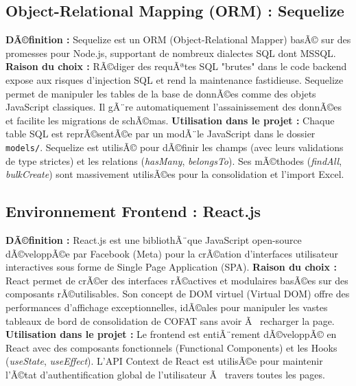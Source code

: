\subsection{Object-Relational Mapping (ORM) : Sequelize}
\textbf{DÃ©finition :} Sequelize est un ORM (Object-Relational Mapper) basÃ© sur des promesses pour Node.js, supportant de nombreux dialectes SQL dont MSSQL.
\newline
\textbf{Raison du choix :} RÃ©diger des requÃªtes SQL "brutes" dans le code backend expose aux risques d'injection SQL et rend la maintenance fastidieuse. Sequelize permet de manipuler les tables de la base de donnÃ©es comme des objets JavaScript classiques. Il gÃ¨re automatiquement l'assainissement des donnÃ©es et facilite les migrations de schÃ©mas.
\newline
\textbf{Utilisation dans le projet :} Chaque table SQL est reprÃ©sentÃ©e par un modÃ¨le JavaScript dans le dossier \texttt{models/}. Sequelize est utilisÃ© pour dÃ©finir les champs (avec leurs validations de type strictes) et les relations (\textit{hasMany}, \textit{belongsTo}). Ses mÃ©thodes (\textit{findAll}, \textit{bulkCreate}) sont massivement utilisÃ©es pour la consolidation et l'import Excel.

\subsection{Environnement Frontend : React.js}
\textbf{DÃ©finition :} React.js est une bibliothÃ¨que JavaScript open-source dÃ©veloppÃ©e par Facebook (Meta) pour la crÃ©ation d'interfaces utilisateur interactives sous forme de Single Page Application (SPA).
\newline
\textbf{Raison du choix :} React permet de crÃ©er des interfaces rÃ©actives et modulaires basÃ©es sur des composants rÃ©utilisables. Son concept de DOM virtuel (Virtual DOM) offre des performances d'affichage exceptionnelles, idÃ©ales pour manipuler les vastes tableaux de bord de consolidation de COFAT sans avoir Ã  recharger la page.
\newline
\textbf{Utilisation dans le projet :} Le frontend est entiÃ¨rement dÃ©veloppÃ© en React avec des composants fonctionnels (Functional Components) et les Hooks (\textit{useState}, \textit{useEffect}). L'API Context de React est utilisÃ©e pour maintenir l'Ã©tat d'authentification global de l'utilisateur Ã  travers toutes les pages.

